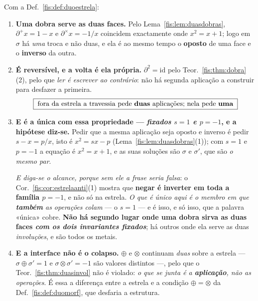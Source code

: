 \documentclass[livro.tex]{subfiles}
\begin{document}
\begin{teorema}\label{fis:thm:duoestrela}
Com a Def.~\ref{fis:def:duoestrela}:
\begin{enumerate}\itemsep3pt
\item[(1)] \textbf{Uma dobra serve as duas faces.} Pelo
Lema~\ref{fis:lem:duasdobras}, $\partial^{+}x=1-x$ e $\partial^{\times}x=-1/x$
coincidem exactamente onde $x^{2}=x+1$; logo em $\sigma$ há \emph{uma} troca e
não duas, e ela é ao mesmo tempo o \textbf{oposto} de uma face e o
\textbf{inverso} da outra.
\item[(2)] \textbf{É reversível, e a volta é ela própria.}
$\partial^{2}=\mathrm{id}$ pelo Teor.~\ref{fis:thm:dobra}(2), pelo que
\emph{ler é escrever ao contrário}: não há segunda aplicação a construir para
desfazer a primeira.
\[
\boxed{\;\text{fora da estrela a travessia pede \textbf{duas} aplicações; nela pede \textbf{uma}}\;}
\]
\item[(3)] \textbf{E é a única com essa propriedade --- \emph{fixados $s=1$ e
$p=-1$}, e a hipótese diz-se.} Pedir que a mesma
aplicação seja oposto e inverso é pedir $s-x=p/x$, isto é $x^{2}=sx-p$
(Lema~\ref{fis:lem:duasdobras}(1)); com $s=1$ e $p=-1$
a equação é $x^{2}=x+1$, e as suas soluções são $\sigma$ e
$\sigma'$, que são \emph{o mesmo par}.

\smallskip
\emph{E diga-se o alcance, porque sem ele a frase seria falsa}: o
Cor.~\ref{fis:cor:estrelaanti}(1) mostra que \textbf{negar é inverter em toda a
família $p=-1$}, e não só na estrela. \emph{O que é único aqui é o membro em que
\textbf{também} as operações colam} --- o $s=1$ --- e é isso, e só isso, que a
palavra «única» cobre. \textbf{Não há segundo lugar onde uma dobra sirva as duas
faces \emph{com os dois invariantes fixados}}; há outros onde ela serve as duas
\emph{involuções}, e são todos os metais.
\item[(4)] \textbf{E a interface não é o colapso.} $\oplus$ e $\otimes$ continuam
\emph{duas} sobre a estrela --- $\sigma\oplus\sigma'=1$ e
$\sigma\otimes\sigma'=-1$ são valores distintos ---, pelo que o
Teor.~\ref{fis:thm:duasinvol} não é violado: \emph{o que se junta é a
\textbf{aplicação}, não as operações}. É essa a diferença entre a estrela e a
condição $\oplus=\otimes$ da Def.~\ref{fis:def:duomorf}, que desfaria a
estrutura.
\end{enumerate}
\end{teorema}
\end{document}
